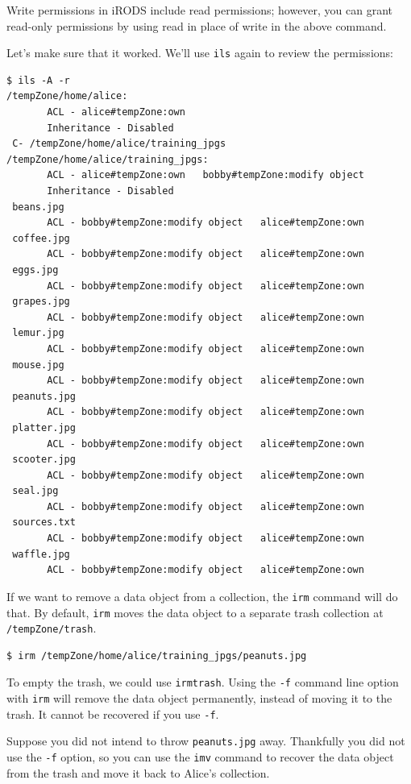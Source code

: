 \documentclass[10pt,oneside]{memoir}
\begin{document}
Write permissions in iRODS include read permissions; however, you can grant read-only permissions by using read in place of write in the above command.

Let's make sure that it worked. We'll use \texttt{ils} again to review the permissions:

\begin{lstlisting}
$ ils -A -r
/tempZone/home/alice:
       ACL - alice#tempZone:own
       Inheritance - Disabled
 C- /tempZone/home/alice/training_jpgs
/tempZone/home/alice/training_jpgs:
       ACL - alice#tempZone:own   bobby#tempZone:modify object
       Inheritance - Disabled
 beans.jpg
       ACL - bobby#tempZone:modify object   alice#tempZone:own
 coffee.jpg
       ACL - bobby#tempZone:modify object   alice#tempZone:own
 eggs.jpg
       ACL - bobby#tempZone:modify object   alice#tempZone:own
 grapes.jpg
       ACL - bobby#tempZone:modify object   alice#tempZone:own
 lemur.jpg
       ACL - bobby#tempZone:modify object   alice#tempZone:own
 mouse.jpg
       ACL - bobby#tempZone:modify object   alice#tempZone:own
 peanuts.jpg
       ACL - bobby#tempZone:modify object   alice#tempZone:own
 platter.jpg
       ACL - bobby#tempZone:modify object   alice#tempZone:own
 scooter.jpg
       ACL - bobby#tempZone:modify object   alice#tempZone:own
 seal.jpg
       ACL - bobby#tempZone:modify object   alice#tempZone:own
 sources.txt
       ACL - bobby#tempZone:modify object   alice#tempZone:own
 waffle.jpg
       ACL - bobby#tempZone:modify object   alice#tempZone:own
\end{lstlisting}

If we want to remove a data object from a collection, the \texttt{irm} command will do that. By default, \texttt{irm} moves the data object to a separate trash collection at \texttt{/tempZone/trash}.

\begin{lstlisting}
$ irm /tempZone/home/alice/training_jpgs/peanuts.jpg
\end{lstlisting}

To empty the trash, we could use \texttt{irmtrash}. Using the \texttt{-f} command line option with \texttt{irm} will remove the data object permanently, instead of moving it to the trash. It cannot be recovered if you use \texttt{-f}.

Suppose you did not intend to throw \texttt{peanuts.jpg} away. Thankfully you did not use the
\texttt{-f} option, so you can use the \texttt{imv} command to recover the data object from the trash and move it back to Alice's collection.
\end{document}
